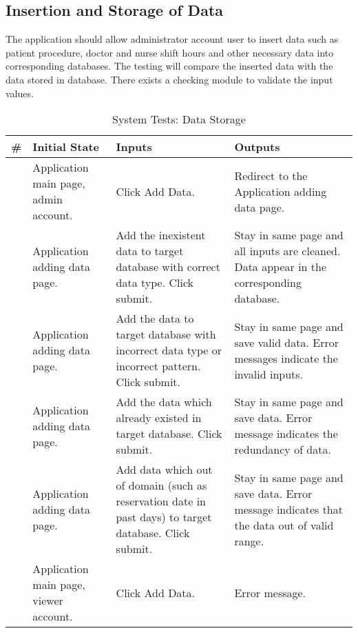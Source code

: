 \documentclass[12pt]{article}
\newcounter{TestCounter}
\begin{document}
\subsection{Insertion and Storage of Data} 
The application should allow administrator account user to insert data such as patient procedure, doctor and nurse shift hours and other necessary data into corresponding databases. The testing will compare the inserted data with the data stored in database. There exists a checking module to validate the input values.
\begin{center}
	\begin{longtable}{c>{\raggedright\arraybackslash}p{4.8cm} >{\raggedright\arraybackslash}p{3cm}>{\raggedright\arraybackslash}p{3cm}}
		\caption{System Tests: Data Storage}\label{DataStorage_SystemTests}\\
		\toprule
		\bf \# & \bf Initial State & \bf Inputs & \bf Outputs \\\midrule
		\stepcounter{TestCounter}\arabic{TestCounter} 
		& Application main page, admin account.
		& Click Add Data.
		& Redirect to the Application adding data page.
		\\\midrule
		\stepcounter{TestCounter}\arabic{TestCounter} 
		& Application adding data page.
		& Add the inexistent data to target database with correct data type. Click submit.
		& Stay in same page and all inputs are cleaned. Data appear in the corresponding database.
		\\\midrule
		\stepcounter{TestCounter}\arabic{TestCounter} 
		& Application adding data page.
		& Add the data to target database with incorrect data type or incorrect pattern.
		Click submit.
		& Stay in same page and save valid data. Error messages indicate the invalid inputs.
		\\\midrule
		\stepcounter{TestCounter}\arabic{TestCounter} 
		& Application adding data page.
		& Add the data which already existed in target database. Click submit.
		& Stay in same page and save data. Error message indicates the redundancy of data.
		\\\midrule
		\stepcounter{TestCounter}\arabic{TestCounter} 
		& Application adding data page.
		& Add data which out of domain (such as reservation date in past days) to target database. Click submit.
		& Stay in same page and save data. Error message indicates that the data out of valid range.
		\\\midrule
		\stepcounter{TestCounter}\arabic{TestCounter} 
		& Application main page, viewer account.
		& Click Add Data. 
		& Error message.
		\\\midrule
		\bottomrule
	\end{longtable}
\end{center}
\end{document}
